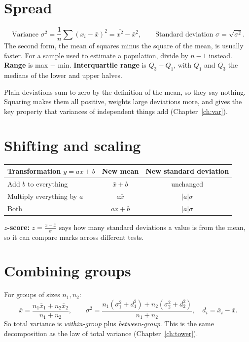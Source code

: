 \documentclass[11pt,a4paper,openany]{report}
\begin{document}
\section{Spread}
\[\text{Variance }\sigma^2=\frac1n\sum(x_i-\bar x)^2=\overline{x^2}-\bar x^2,\qquad\text{Standard deviation }\sigma=\sqrt{\sigma^2}.\]
The second form, the mean of squares minus the square of the mean, is usually faster. For a sample used to estimate a population, divide by $n-1$ instead. \textbf{Range} is max $-$ min. \textbf{Interquartile range} is $Q_3-Q_1$, with $Q_1$ and $Q_3$ the medians of the lower and upper halves.

\begin{why}
Plain deviations sum to zero by the definition of the mean, so they say nothing. Squaring makes them all positive, weights large deviations more, and gives the key property that variances of independent things add (Chapter~\ref{ch:var}).
\end{why}

\section{Shifting and scaling}
\begin{center}
\begin{tabular}{lcc}
\toprule
Transformation $y=ax+b$ & New mean & New standard deviation\\\midrule
Add $b$ to everything & $\bar x+b$ & unchanged\\
Multiply everything by $a$ & $a\bar x$ & $|a|\sigma$\\
Both & $a\bar x+b$ & $|a|\sigma$\\
\bottomrule
\end{tabular}
\end{center}
\textbf{$z$-score:} $z=\frac{x-\bar x}\sigma$ says how many standard deviations a value is from the mean, so it can compare marks across different tests.

\section{Combining groups}
For groups of sizes $n_1,n_2$:
\[\bar x=\frac{n_1\bar x_1+n_2\bar x_2}{n_1+n_2},\qquad\sigma^2=\frac{n_1(\sigma_1^2+d_1^2)+n_2(\sigma_2^2+d_2^2)}{n_1+n_2},\quad d_i=\bar x_i-\bar x.\]
So total variance is \emph{within-group} plus \emph{between-group}. This is the same decomposition as the law of total variance (Chapter~\ref{ch:tower}).
\end{document}
